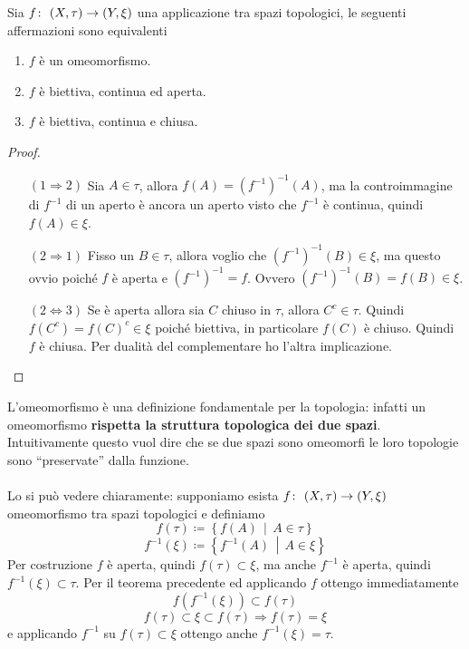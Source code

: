 \begin{theorem}
	Sia $f \colon\ (X,\tau) \rightarrow (Y,\xi)$ una applicazione tra spazi topologici, le seguenti affermazioni sono equivalenti
	\begin{enumerate}
		\item $f$ è un omeomorfismo.
		\item $f$ è biettiva, continua ed aperta.
		\item $f$ è biettiva, continua e chiusa.
	\end{enumerate}
\end{theorem}
\begin{proof} \
	\begin{enumerate}
		\item[$(1 \Rightarrow 2)$] Sia $A \in \tau$, allora $f(A) = (f^{-1})^{-1}(A)$, ma la controimmagine di $f^{-1}$ di un aperto è ancora un aperto visto che $f^{-1}$ è continua, quindi $f(A) \in \xi$.
		\item[$(2 \Rightarrow 1)$] Fisso un $B \in \tau$, allora voglio che $(f^{-1})^{-1}(B) \in \xi$, ma questo ovvio poiché $f$ è aperta e $(f^{-1})^{-1} = f$. Ovvero $(f^{-1})^{-1}(B) = f(B) \in \xi$.
		\item[$(2\Leftrightarrow 3)$] Se è aperta allora sia $C$ chiuso in $\tau$, allora $C^{c} \in \tau$. Quindi $f(C^c) = f(C)^c \in \xi$ poiché biettiva, in particolare $f(C)$ è chiuso. Quindi $f$ è chiusa. Per dualità del complementare ho l'altra implicazione.
	\end{enumerate}
\end{proof}

\begin{remark} L'omeomorfismo è una definizione fondamentale per la topologia: infatti un omeomorfismo \textbf{rispetta la struttura topologica dei due spazi}.
	Intuitivamente questo vuol dire che se due spazi sono omeomorfi le loro topologie sono \enquote{preservate} dalla funzione. \\ \\ 
	Lo si può vedere chiaramente: supponiamo esista $f \colon\ (X,\tau) \rightarrow (Y,\xi)$ omeomorfismo tra spazi topologici e definiamo
	\begin{equation*}
	f(\tau) \coloneqq \left\{ f(A) \,\middle|\,  A \in \tau\right\} 
	\end{equation*}
	\begin{equation*}
	f^{-1}(\xi) \coloneqq \left\{ f^{-1}(A) \,\middle|\,  A \in \xi\right\} 
	\end{equation*}
	 Per costruzione $f$ è aperta, quindi $f(\tau) \subset \xi$, ma anche $f^{-1}$ è aperta, quindi $f^{-1}(\xi) \subset \tau$. Per il teorema precedente ed applicando $f$ ottengo immediatamente
	\begin{equation*}
	f\left(f^{-1}(\xi)\right) \subset f(\tau)
	\end{equation*}
	\begin{equation*}
		f(\tau) \subset \xi \subset f(\tau) \Longrightarrow f(\tau) = \xi
	\end{equation*} 
	e applicando $f^{-1}$ su $f(\tau) \subset \xi$ ottengo anche $f^{-1}(\xi) = \tau$.
\end{remark}

